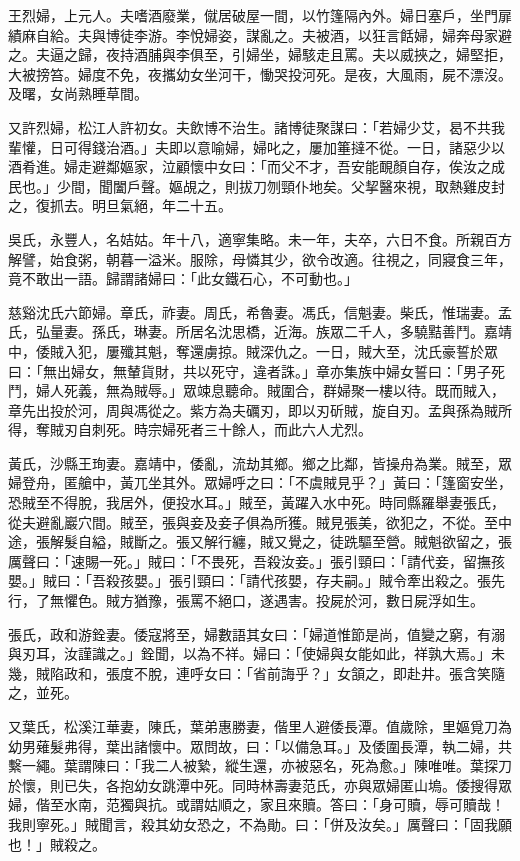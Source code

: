 \begin{pinyinscope}
王烈婦，上元人。夫嗜酒廢業，僦居破屋一間，以竹篷隔內外。婦日塞戶，坐門扉績麻自給。夫與博徒李游。李悅婦姿，謀亂之。夫被酒，以狂言餂婦，婦奔母家避之。夫逼之歸，夜持酒脯與李俱至，引婦坐，婦駭走且罵。夫以威挾之，婦堅拒，大被搒笞。婦度不免，夜攜幼女坐河干，慟哭投河死。是夜，大風雨，屍不漂沒。及曙，女尚熟睡草間。

又許烈婦，松江人許初女。夫飲博不治生。諸博徒聚謀曰：「若婦少艾，曷不共我輩懽，日可得錢治酒。」夫即以意喻婦，婦叱之，屢加箠撻不從。一日，諸惡少以酒肴進。婦走避鄰嫗家，泣顧懷中女曰：「而父不才，吾安能靦顏自存，俟汝之成民也。」少間，聞闔戶聲。嫗覘之，則拔刀刎頸仆地矣。父挈醫來視，取熱雞皮封之，復抓去。明旦氣絕，年二十五。

吳氏，永豐人，名姞姑。年十八，適寧集略。未一年，夫卒，六日不食。所親百方解譬，始食粥，朝暮一溢米。服除，母憐其少，欲令改適。往視之，同寢食三年，竟不敢出一語。歸謂諸婦曰：「此女鐵石心，不可動也。」

慈谿沈氏六節婦。章氏，祚妻。周氏，希魯妻。馮氏，信魁妻。柴氏，惟瑞妻。孟氏，弘量妻。孫氏，琳妻。所居名沈思橋，近海。族眾二千人，多驍黠善鬥。嘉靖中，倭賊入犯，屢殲其魁，奪還虜掠。賊深仇之。一日，賊大至，沈氏豪誓於眾曰：「無出婦女，無輦貨財，共以死守，違者誅。」章亦集族中婦女誓曰：「男子死鬥，婦人死義，無為賊辱。」眾竦息聽命。賊圍合，群婦聚一樓以待。既而賊入，章先出投於河，周與馮從之。紫方為夫礪刃，即以刃斫賊，旋自刃。孟與孫為賊所得，奪賊刃自刺死。時宗婦死者三十餘人，而此六人尤烈。

黃氏，沙縣王珣妻。嘉靖中，倭亂，流劫其鄉。鄉之比鄰，皆操舟為業。賊至，眾婦登舟，匿艙中，黃兀坐其外。眾婦呼之曰：「不虞賊見乎？」黃曰：「篷窗安坐，恐賊至不得脫，我居外，便投水耳。」賊至，黃躍入水中死。時同縣羅舉妻張氏，從夫避亂巖穴間。賊至，張與妾及妾子俱為所獲。賊見張美，欲犯之，不從。至中途，張解髮自縊，賊斷之。張又解行纏，賊又覺之，徒跣驅至營。賊魁欲留之，張厲聲曰：「速賜一死。」賊曰：「不畏死，吾殺汝妾。」張引頸曰：「請代妾，留撫孩嬰。」賊曰：「吾殺孩嬰。」張引頸曰：「請代孩嬰，存夫嗣。」賊令牽出殺之。張先行，了無懼色。賊方猶豫，張罵不絕口，遂遇害。投屍於河，數日屍浮如生。

張氏，政和游銓妻。倭寇將至，婦數語其女曰：「婦道惟節是尚，值變之窮，有溺與刃耳，汝謹識之。」銓聞，以為不祥。婦曰：「使婦與女能如此，祥孰大焉。」未幾，賊陷政和，張度不脫，連呼女曰：「省前誨乎？」女頷之，即赴井。張含笑隨之，並死。

又葉氏，松溪江華妻，陳氏，葉弟惠勝妻，偕里人避倭長潭。值歲除，里嫗覓刀為幼男薙髮弗得，葉出諸懷中。眾問故，曰：「以備急耳。」及倭圍長潭，執二婦，共繫一繩。葉謂陳曰：「我二人被縶，縱生還，亦被惡名，死為愈。」陳唯唯。葉探刀於懷，則已失，各抱幼女跳潭中死。同時林壽妻范氏，亦與眾婦匿山塢。倭搜得眾婦，偕至水南，范獨與抗。或謂姑順之，家且來贖。答曰：「身可贖，辱可贖哉！我則寧死。」賊聞言，殺其幼女恐之，不為勛。曰：「併及汝矣。」厲聲曰：「固我願也！」賊殺之。


\end{pinyinscope}
